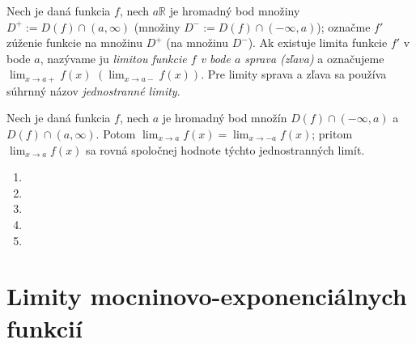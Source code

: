 Nech je daná funkcia $f$, nech $a \mathbb{R}$ je hromadný bod množiny $D^+:=D(f)\cap (a,\infty)$ (množiny $D^-:=D(f)\cap (-\infty,a)$); označme $f'$ zúženie funkcie na množinu $D^+$ (na množinu $D^-$). Ak existuje limita funkcie $f'$ v bode $a$, nazývame ju \textit{limitou funkcie $f$ v bode $a$ sprava (zľava)} a označujeme $\lim_{x \rightarrow a+} f(x)$ $(\lim_{x \rightarrow a-} f(x))$. Pre limity sprava a zľava sa používa súhrnný názov \textit{jednostranné limity}.

\begin{veta}
Nech je daná funkcia $f$, nech $a$ je hromadný bod množín $D(f) \cap (-\infty,a)$ a $D(f) \cap (a,\infty)$. Potom $\lim_{x \rightarrow a} f(x)=\lim_{x \rightarrow -a} f(x)$; pritom $\lim_{x \rightarrow a} f(x)$ sa rovná spoločnej hodnote týchto jednostranných limít.
\end{veta}

\begin{enumerate}[resume]
	\item {}
	\item {}
	\item {}
	\item {}
	\item {}
\end{enumerate}

\section{Limity mocninovo-exponenciálnych funkcií}